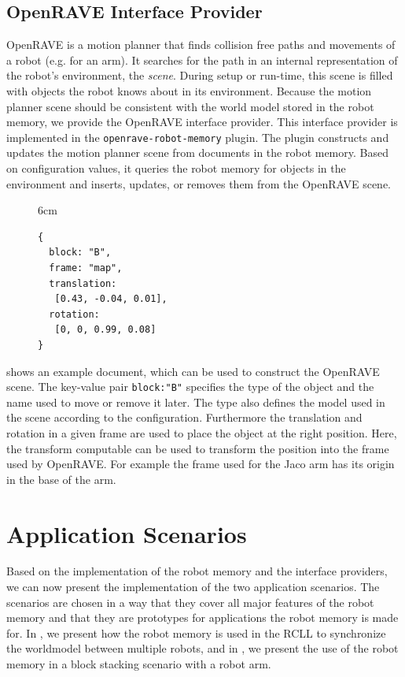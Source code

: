 \subsection{OpenRAVE Interface Provider}
\label{sec:impl-openrave}
OpenRAVE is a motion planner that finds collision free paths and
movements of a robot (e.g. for an arm). It searches for the path in an
internal representation of the robot's environment, the
\emph{scene}. During setup or run-time, this scene is filled with
objects the robot knows about in its environment. Because the motion
planner scene should be consistent with the world model stored in the
robot memory, we provide the OpenRAVE interface provider. This
interface provider is implemented in the
\texttt{openrave-robot-memory} plugin. The plugin constructs and
updates the motion planner scene from documents in the robot
memory. Based on configuration values, it queries the robot memory for
objects in the environment and inserts, updates, or removes them from
the OpenRAVE scene.
\begin{figure}{6cm}
  \vspace{-0.8cm}
\begin{lstlisting}[style=SmallJSON,
  caption={Document used to construct the OpenRAVE scene},
  label=lst:openrave,
  framexleftmargin=5pt, xleftmargin=0pt,
 morekeywords={}, numbers=none]
{
  block: "B",
  frame: "map",
  translation:
   [0.43, -0.04, 0.01],
  rotation:
   [0, 0, 0.99, 0.08]
}
\end{lstlisting}
\vspace{-8mm}
\end{figure}
 shows an example document, which can be used to
construct the OpenRAVE scene. The key-value pair \texttt{block:"B"}
specifies the type of the object and the name used to move or remove
it later. The type also defines the model used in the scene according
to the configuration. Furthermore the translation and rotation in a
given frame are used to place the object at the right position. Here,
the transform computable can be used to transform the position into
the frame used by OpenRAVE. For example the frame used for the Jaco
arm has its origin in the base of the arm.

\section{Application Scenarios}
\label{sec:applicationscenarios}
Based on the implementation of the robot memory and the interface
providers, we can now present the implementation of the two
application scenarios. The scenarios are chosen in a way that they
cover all major features of the robot memory and that they are
prototypes for applications the robot memory is made for.
In , we present how the robot memory is used in
the RCLL to synchronize the worldmodel between multiple robots, and in
, we present the use of the robot memory
in a block stacking scenario with a robot arm.

